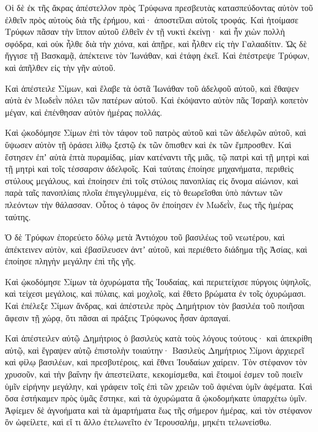 {\par }{\PP {}Οἱ δὲ ἐκ τῆς ἄκρας ἀπέστελλον πρὸς Τρύφωνα πρεσβευτὰς κατασπεύδοντας αὐτὸν τοῦ ἐλθεῖν πρὸς αὐτοὺς διὰ τῆς ἐρήμου, καὶ· ἀποστεῖλαι αὐτοῖς τροφάς.
Καὶ ἡτοίμασε Τρύφων πᾶσαν τὴν ἵππον αὐτοῦ ἐλθεῖν ἐν τῇ νυκτὶ ἐκείνῃ· καὶ ἦν χιὼν πολλὴ σφόδρα, καὶ οὐκ ἦλθε διὰ τὴν χιόνα, καὶ ἀπῇρε, καὶ ἦλθεν εἰς τὴν Γαλααδίτιν.
Ὡς δὲ ἤγγισε τῇ Βασκαμᾷ, ἀπέκτεινε τὸν Ἰωνάθαν, καὶ ἐτάφη ἐκεῖ.
Καὶ ἐπέστρεψε Τρύφων, καὶ ἀπῆλθεν εἰς τὴν γῆν αὐτοῦ.
\par }{\PP {}Καὶ ἀπέστειλε Σίμων, καὶ ἔλαβε τὰ ὀστᾶ Ἰωνάθαν τοῦ ἀδελφοῦ αὐτοῦ, καὶ ἔθαψεν αὐτὰ ἐν Μωδεῒν πόλει τῶν πατέρων αὐτοῦ.
Καὶ ἐκόψαντο αὐτὸν πᾶς Ἰσραὴλ κοπετὸν μέγαν, καὶ ἐπένθησαν αὐτὸν ἡμέρας πολλάς.
\par }{\PP {}Καὶ ᾠκοδόμησε Σίμων ἐπὶ τὸν τάφον τοῦ πατρὸς αὐτοῦ καὶ τῶν ἀδελφῶν αὐτοῦ, καὶ ὕψωσεν αὐτὸν τῇ ὁράσει λίθῳ ξεστῷ ἐκ τῶν ὄπισθεν καὶ ἐκ τῶν ἔμπροσθεν.
Καὶ ἔστησεν ἐπʼ αὐτὰ ἑπτὰ πυραμίδας, μίαν κατέναντι τῆς μιᾶς, τῷ πατρὶ καὶ τῇ μητρὶ καὶ τῇ μητρὶ καὶ τοῖς τέσσαρσιν ἀδελφοῖς.
Καὶ ταύταις ἐποίησε μηχανήματα, περιθεὶς στύλους μεγάλους, καὶ ἐποίησεν ἐπὶ τοῖς στύλοις πανοπλίας εἰς ὄνομα αἰώνιον, καὶ παρὰ ταῖς πανοπλίαις πλοῖα ἐπιγεγλυμμένα, εἰς τὸ θεωρεῖσθαι ὑπὸ πάντων τῶν πλεόντων τὴν θάλασσαν.
Οὗτος ὁ τάφος ὃν ἐποίησεν ἐν Μωδεῒν, ἕως τῆς ἡμέρας ταύτης.
\par }{\PP {}Ὁ δὲ Τρύφων ἐπορεύετο δόλῳ μετὰ Ἀντιόχου τοῦ βασιλέως τοῦ νεωτέρου, καὶ ἀπέκτεινεν αὐτὸν,
καὶ ἐβασίλευσεν ἀντʼ αὐτοῦ, καὶ περιέθετο διάδημα τῆς Ἀσίας, καὶ ἐποίησε πληγὴν μεγάλην ἐπὶ τῆς γῆς.
\par }{\PP {}Καὶ ᾠκοδόμησε Σίμων τὰ ὀχυρώματα τῆς Ἰουδαίας, καὶ περιετείχισε πύργοις ὑψηλοῖς, καὶ τείχεσι μεγάλοις, καὶ πύλαις, καὶ μοχλοῖς, καὶ ἔθετο βρώματα ἐν τοῖς ὀχυρώμασι.
Καὶ ἐπέλεξε Σίμων ἄνδρας, καὶ ἀπέστειλε πρὸς Δημήτριον τὸν βασιλέα τοῦ ποιῆσαι ἄφεσιν τῇ χώρᾳ, ὅτι πᾶσαι αἱ πράξεις Τρύφωνος ἦσαν ἁρπαγαί.
\par }{\PP {}Καὶ ἀπέστειλεν αὐτῷ Δημήτριος ὁ βασιλεὺς κατὰ τοὺς λόγους τούτους· καὶ ἀπεκρίθη αὐτῷ, καὶ ἔγραψεν αὐτῷ ἐπιστολὴν τοιαύτην·
Βασιλεὺς Δημήτριος Σίμονι ἀρχιερεῖ καὶ φίλῳ βασιλέων, καὶ πρεσβυτέροις, καὶ ἔθνει Ἰουδαίων χαίρειν.
Τὸν στέφανον τὸν χρυσοῦν, καὶ τὴν βαΐνην ἣν ἀπεστείλατε, κεκομίσμεθα, καὶ ἕτοιμοί ἐσμεν τοῦ ποιεῖν ὑμῖν εἰρήνην μεγάλην, καὶ γράφειν τοῖς ἐπὶ τῶν χρειῶν τοῦ ἀφιέναι ὑμῖν ἀφέματα.
Καὶ ὅσα ἑστήκαμεν πρὸς ὑμᾶς ἔστηκε, καὶ τὰ ὀχυρώματα ἃ ᾠκοδομήκατε ὑπαρχέτω ὑμῖν.
Ἀφίεμεν δὲ ἀγνοήματα καὶ τὰ ἁμαρτήματα ἕως τῆς σήμερον ἡμέρας, καὶ τὸν στέφανον ὃν ὠφείλετε, καὶ εἴ τι ἄλλο ἐτελωνεῖτο ἐν Ἱερουσαλήμ, μηκέτι τελωνείσθω.
}
